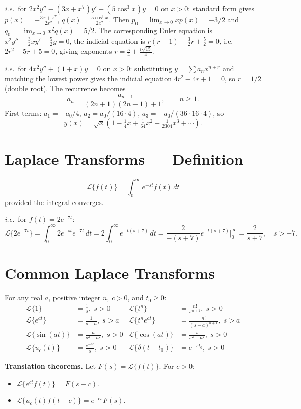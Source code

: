 \documentclass[11pt]{article}
\newcommand{\Lap}{\mathcal{L}}
\begin{document}
\textit{i.e.}\ for $2x^2 y'' - (3x + x^7)y' + (5\cos^3 x)y = 0$ on $x > 0$: standard form gives $p(x) = -\frac{3x + x^7}{2x^2}$, $q(x) = \frac{5\cos^3 x}{2x^2}$. Then $p_0 = \lim_{x\to 0} x p(x) = -3/2$ and $q_0 = \lim_{x\to 0} x^2 q(x) = 5/2$. The corresponding Euler equation is $x^2 y'' - \tfrac{3}{2}xy' + \tfrac{5}{2}y = 0$, the indicial equation is $r(r-1) - \tfrac{3}{2}r + \tfrac{5}{2} = 0$, i.e.\ $2r^2 - 5r + 5 = 0$, giving exponents $r = \tfrac{5}{4} \pm \tfrac{i\sqrt{15}}{4}$.
 
\textit{i.e.}\ for $4x^2 y'' + (1 + x)y = 0$ on $x > 0$: substituting $y = \sum a_n x^{n+r}$ and matching the lowest power gives the indicial equation $4r^2 - 4r + 1 = 0$, so $r = 1/2$ (double root). The recurrence becomes
\[
a_n = \frac{-a_{n-1}}{(2n+1)(2n-1) + 1}, \qquad n \geq 1.
\]
First terms: $a_1 = -a_0/4$, $a_2 = a_0/(16\cdot 4)$, $a_3 = -a_0/(36\cdot 16 \cdot 4)$, so
\[
y(x) = \sqrt{x}\left(1 - \tfrac{1}{4}x + \tfrac{1}{64}x^2 - \tfrac{1}{2304}x^3 + \cdots\right).
\]
 
\section*{Laplace Transforms --- Definition}
\[
\Lap\{f(t)\} = \int_0^\infty e^{-st} f(t)\,dt
\]
provided the integral converges.
 
\textit{i.e.}\ for $f(t) = 2e^{-7t}$:
\[
\Lap\{2e^{-7t}\} = \int_0^\infty 2e^{-st}e^{-7t}\,dt = 2\int_0^\infty e^{-t(s+7)}\,dt = \frac{2}{-(s+7)}e^{-t(s+7)}\Big|_0^\infty = \frac{2}{s+7}, \quad s > -7.
\]
 
\section*{Common Laplace Transforms}
For any real $a$, positive integer $n$, $c > 0$, and $t_0 \geq 0$:
\begin{align*}
\Lap\{1\} &= \tfrac{1}{s}, \; s > 0 & \Lap\{t^n\} &= \tfrac{n!}{s^{n+1}}, \; s > 0 \\
\Lap\{e^{at}\} &= \tfrac{1}{s-a}, \; s > a & \Lap\{t^n e^{at}\} &= \tfrac{n!}{(s-a)^{n+1}}, \; s > a \\
\Lap\{\sin(at)\} &= \tfrac{a}{s^2 + a^2}, \; s > 0 & \Lap\{\cos(at)\} &= \tfrac{s}{s^2 + a^2}, \; s > 0 \\
\Lap\{u_c(t)\} &= \tfrac{e^{-sc}}{s}, \; s > 0 & \Lap\{\delta(t - t_0)\} &= e^{-st_0}, \; s > 0
\end{align*}
 
\textbf{Translation theorems.} Let $F(s) = \Lap\{f(t)\}$. For $c > 0$:
\begin{itemize}[leftmargin=*]
    \item $\Lap\{e^{ct} f(t)\} = F(s - c)$.
    \item $\Lap\{u_c(t) f(t - c)\} = e^{-cs}F(s)$.
\end{itemize}
 
\end{document}
